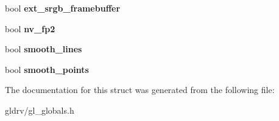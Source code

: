 \begin{DoxyCompactItemize}
\item 
bool {\bfseries ext\+\_\+srgb\+\_\+framebuffer}\hypertarget{structgl__options__t_a181473cb6d723c0a96ae5940cb2fad29}{}\label{structgl__options__t_a181473cb6d723c0a96ae5940cb2fad29}

\item 
bool {\bfseries nv\+\_\+fp2}\hypertarget{structgl__options__t_ad546c9d3c396201ff9c84936dc411c74}{}\label{structgl__options__t_ad546c9d3c396201ff9c84936dc411c74}

\item 
bool {\bfseries smooth\+\_\+lines}\hypertarget{structgl__options__t_a6b11c00608eab0d055ef94b2c7331aac}{}\label{structgl__options__t_a6b11c00608eab0d055ef94b2c7331aac}

\item 
bool {\bfseries smooth\+\_\+points}\hypertarget{structgl__options__t_a76f6f22e9bc78fdc328e2b15ff5897ca}{}\label{structgl__options__t_a76f6f22e9bc78fdc328e2b15ff5897ca}

\end{DoxyCompactItemize}


The documentation for this struct was generated from the following file\+:\begin{DoxyCompactItemize}
\item 
gldrv/gl\+\_\+globals.\+h\end{DoxyCompactItemize}
